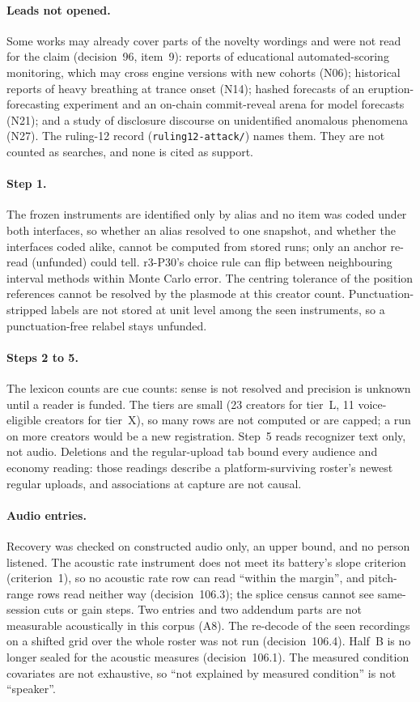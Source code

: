 \paragraph{Leads not opened.} Some works may already cover parts of the novelty wordings and were not read for the
claim (decision~96, item~9): reports of educational automated-scoring monitoring, which may cross engine versions with
new cohorts (N06); historical reports of heavy breathing at trance onset (N14); hashed
forecasts of an eruption-forecasting experiment and an on-chain commit-reveal arena for model forecasts (N21); and a
study of disclosure discourse on unidentified anomalous phenomena (N27). The ruling-12 record (\texttt{ruling12-attack/})
names them. They are not counted as searches, and none is cited as support.

\paragraph{Step 1.} The frozen instruments are identified only by alias and no item was coded under both interfaces, so
whether an alias resolved to one snapshot, and whether the interfaces coded alike, cannot be computed from stored runs;
only an anchor re-read (unfunded) could tell. r3-P30's choice rule can flip between neighbouring interval methods
within Monte Carlo error. The centring tolerance of the position references cannot be resolved by the plasmode at this
creator count. Punctuation-stripped labels are not stored at unit level among the seen instruments, so a
punctuation-free relabel stays unfunded.

\paragraph{Steps 2 to 5.} The lexicon counts are cue counts: sense is not resolved and precision is unknown until a
reader is funded. The tiers are small (23 creators for tier~L, 11 voice-eligible creators for tier~X), so many rows are
not computed or are capped; a run on more creators would be a new registration. Step~5 reads recognizer text only, not
audio. Deletions and the regular-upload tab bound every audience and economy reading: those readings describe a
platform-surviving roster's newest regular uploads, and associations at capture are not causal.

\paragraph{Audio entries.} Recovery was checked on constructed audio only, an upper bound, and no person listened. The
acoustic rate instrument does not meet its battery's slope criterion (criterion~1), so no acoustic rate row can read
``within the margin'', and pitch-range rows read neither way (decision~106.3); the splice census cannot see same-session
cuts or gain steps. Two entries and two addendum parts are not measurable acoustically in this corpus (A8). The re-decode
of the seen recordings on a shifted grid over the whole roster was not run (decision~106.4). Half~B is no longer sealed
for the acoustic measures (decision~106.1). The measured condition covariates are not exhaustive, so ``not explained by
measured condition'' is not ``speaker''.

